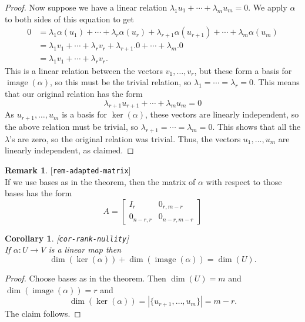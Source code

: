 \documentclass{amsart}
\newcommand{\lbl}[1]{\label{#1}\textup{[\texttt{#1}]}\ \\}
\newcommand{\lbl}{\label}
\newcommand{\img}       {\operatorname{image}}
\newcommand{\al}        {\alpha}
\newcommand{\lm}        {\lambda}
\newcommand{\xra}       {\xrightarrow}
\renewcommand{\:}       {\colon}
\newtheorem{corollary}[theorem]{Corollary}
\theoremstyle{definition}
\newtheorem{remark}[theorem]{Remark}
\begin{document}
\begin{proof}
 Now suppose we have a linear relation
 $\lm_1u_1+\dotsb+\lm_mu_m=0$.  We apply $\al$ to both sides
 of this equation to get 
 \begin{align*}
  0 &= \lm_1\al(u_1) + \dotsb + \lm_r\al(u_r) 
       + \lm_{r+1}\al(u_{r+1}) + \dotsb + \lm_m\al(u_m) \\
    &= \lm_1v_1 + \dotsb + \lm_rv_r + 
       \lm_{r+1}.0 + \dotsb + \lm_m.0 \\
    &= \lm_1v_1 + \dotsb + \lm_rv_r.
 \end{align*}
 This is a linear relation between the vectors
 $v_1,\dotsc,v_r$, but these form a basis for $\img(\al)$,
 so this must be the trivial relation, so
 $\lm_1=\dotsb=\lm_r=0$.  This means that our original
 relation has the form
 \[ \lm_{r+1} u_{r+1} + \dotsb + \lm_mu_m = 0 \]
 As $u_{r+1},\dotsc,u_m$ is a basis for $\ker(\al)$, these
 vectors are linearly independent, so the above relation
 must be trivial, so $\lm_{r+1}=\dotsb=\lm_m=0$.  This shows
 that all the $\lm$'s are zero, so the original relation was
 trivial.  Thus, the vectors $u_1,\dotsc,u_m$ are linearly
 independent, as claimed.
\end{proof}
\begin{remark}\lbl{rem-adapted-matrix}
 If we use bases as in the theorem, then the matrix of $\al$
 with respect to those bases has the form
 \[ A = \left[\begin{array}{c|c}
     I_r & 0_{r,m-r} \\
     0_{n-r,r} & 0_{n-r,m-r}
    \end{array}\right]
 \]
\end{remark}

\begin{corollary}\lbl{cor-rank-nullity}
 If $\al\:U\xra{}V$ is a linear map then
 \[ \dim(\ker(\al)) + \dim(\img(\al)) = \dim(U). \]
\end{corollary}
\begin{proof}
 Choose bases as in the theorem.  Then $\dim(U)=m$ and
 $\dim(\img(\al))=r$ and 
 \[ \dim(\ker(\al)) = |\{u_{r+1},\dotsc,u_m\}| = m-r. \]
 The claim follows.
\end{proof}
\end{document}
